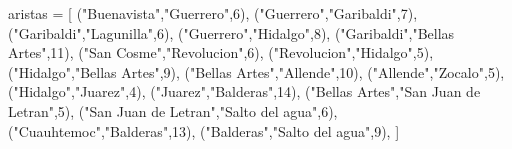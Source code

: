 \documentclass[
]{article}
\newenvironment{Shaded}{}{}
\newcommand{\DecValTok}[1]{\textcolor[rgb]{0.25,0.63,0.44}{#1}}
\newcommand{\NormalTok}[1]{#1}
\newcommand{\OperatorTok}[1]{\textcolor[rgb]{0.40,0.40,0.40}{#1}}
\newcommand{\StringTok}[1]{\textcolor[rgb]{0.25,0.44,0.63}{#1}}
\begin{document}
\begin{Shaded}
\begin{Highlighting}[]
\NormalTok{aristas }\OperatorTok{=}\NormalTok{ [}
\NormalTok{    (}\StringTok{"Buenavista"}\NormalTok{,}\StringTok{"Guerrero"}\NormalTok{,}\DecValTok{6}\NormalTok{),}
\NormalTok{    (}\StringTok{"Guerrero"}\NormalTok{,}\StringTok{"Garibaldi"}\NormalTok{,}\DecValTok{7}\NormalTok{),}
\NormalTok{    (}\StringTok{"Garibaldi"}\NormalTok{,}\StringTok{"Lagunilla"}\NormalTok{,}\DecValTok{6}\NormalTok{),}
\NormalTok{    (}\StringTok{"Guerrero"}\NormalTok{,}\StringTok{"Hidalgo"}\NormalTok{,}\DecValTok{8}\NormalTok{),}
\NormalTok{    (}\StringTok{"Garibaldi"}\NormalTok{,}\StringTok{"Bellas Artes"}\NormalTok{,}\DecValTok{11}\NormalTok{),}
\NormalTok{    (}\StringTok{"San Cosme"}\NormalTok{,}\StringTok{"Revolucion"}\NormalTok{,}\DecValTok{6}\NormalTok{),}
\NormalTok{    (}\StringTok{"Revolucion"}\NormalTok{,}\StringTok{"Hidalgo"}\NormalTok{,}\DecValTok{5}\NormalTok{),}
\NormalTok{    (}\StringTok{"Hidalgo"}\NormalTok{,}\StringTok{"Bellas Artes"}\NormalTok{,}\DecValTok{9}\NormalTok{),}
\NormalTok{    (}\StringTok{"Bellas Artes"}\NormalTok{,}\StringTok{"Allende"}\NormalTok{,}\DecValTok{10}\NormalTok{),}
\NormalTok{    (}\StringTok{"Allende"}\NormalTok{,}\StringTok{"Zocalo"}\NormalTok{,}\DecValTok{5}\NormalTok{),}
\NormalTok{    (}\StringTok{"Hidalgo"}\NormalTok{,}\StringTok{"Juarez"}\NormalTok{,}\DecValTok{4}\NormalTok{),}
\NormalTok{    (}\StringTok{"Juarez"}\NormalTok{,}\StringTok{"Balderas"}\NormalTok{,}\DecValTok{14}\NormalTok{),}
\NormalTok{    (}\StringTok{"Bellas Artes"}\NormalTok{,}\StringTok{"San Juan de Letran"}\NormalTok{,}\DecValTok{5}\NormalTok{),}
\NormalTok{    (}\StringTok{"San Juan de Letran"}\NormalTok{,}\StringTok{"Salto del agua"}\NormalTok{,}\DecValTok{6}\NormalTok{),}
\NormalTok{    (}\StringTok{"Cuauhtemoc"}\NormalTok{,}\StringTok{"Balderas"}\NormalTok{,}\DecValTok{13}\NormalTok{),}
\NormalTok{    (}\StringTok{"Balderas"}\NormalTok{,}\StringTok{"Salto del agua"}\NormalTok{,}\DecValTok{9}\NormalTok{),}
\NormalTok{]}
\end{Highlighting}
\end{Shaded}


\pagestyle{empty}
\thispagestyle{empty}
\end{document}

